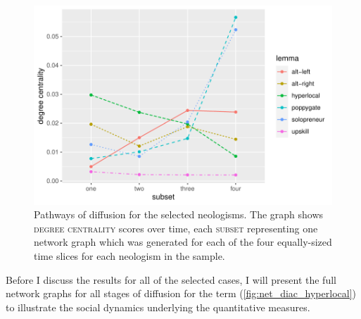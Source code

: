 \documentclass[
  a4paper,
  abstract=on,
  captions=tableabove
  ]{scrartcl}
\begin{document}
      \begin{figure}
        \caption[Centralization over time for the selected neologisms]{Pathways of diffusion for the selected neologisms. The graph shows \textsc{degree centrality} scores over time, each \textsc{subset} representing one network graph which was generated for each of the four equally-sized time slices for each neologism in the sample.}
        \label{fig:cent_diac_cases}
        \centering
        \includegraphics[width=\linewidth, height=.8\textheight, keepaspectratio]{img/cases_cent_diac.pdf}
      \end{figure}

      Before I discuss the results for all of the selected cases, I will present the full network graphs for all stages of diffusion for the term  (\ref{fig:net_diac_hyperlocal}) to illustrate the social dynamics underlying the quantitative measures.
\end{document}
